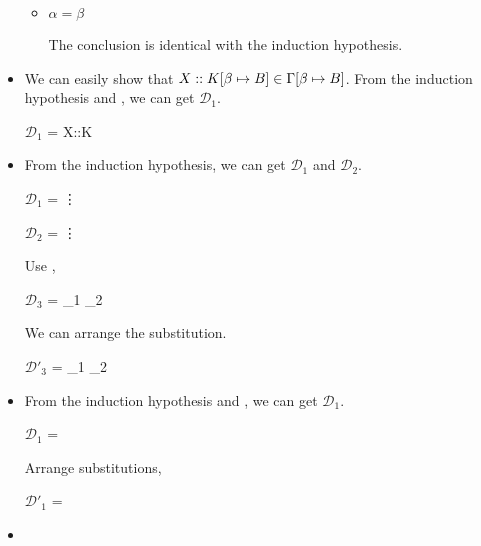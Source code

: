 \begin{itemize}
\begin{itemize}
		      \item $\alpha = \beta$

		            The conclusion is identical with the induction hypothesis.

	      \end{itemize}

	\item \KVar

	      We can easily show that $X::K[\beta \mapsto B] \in \Gamma[\beta \mapsto B]$.
	      From the induction hypothesis and \KVar, we can get $\mathcal{D}_1$.

	      $\mathcal{D}_1$ = 
	      {X::K\SB \in \GG \andalso {}}

	\item \KAbs

	      From the induction hypothesis, we can get $\mathcal{D}_1$ and $\mathcal{D}_2$.

	      $\mathcal{D}_1$ = 
	      {\vdots}

	      $\mathcal{D}_2$ = 
	      {\vdots}

	      Use \KAbs,

	      $\mathcal{D}_3$ = 
	      {_1 \andalso {}_2}

	      We can arrange the substitution.

	      $\mathcal{D}'_3$ = 
	      {_1 \andalso {}_2}

	\item \KApp

	      From the induction hypothesis and \KApp, we can get $\mathcal{D}_1$.

	      $\mathcal{D}_1$ = 
	      { \andalso {}}

	      Arrange substitutions,

	      $\mathcal{D}'_1$ = 
	      { \andalso {}}

	\item \KConv


\end{itemize}
